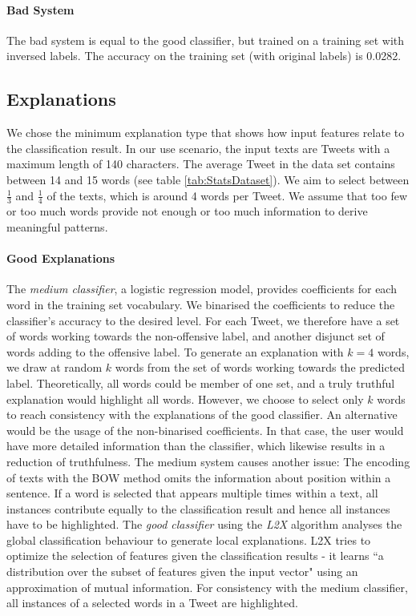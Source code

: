 \paragraph{Bad System}
The bad system is equal to the good classifier, but trained on a training set with inversed labels. The accuracy on the training set (with original labels) is 0.0282.



\subsection{Explanations} 
We chose the minimum explanation type that shows how input features relate to the classification result. In our use scenario, the input texts are Tweets with a maximum length of 140 characters. The average Tweet in the data set contains between 14 and 15 words (see table \ref{tab:StatsDataset}). We aim to select between $\frac{1}{3}$ and $\frac{1}{4}$ of the texts, which is around 4 words per Tweet. We assume that too few or too much words provide not enough or too much information to derive meaningful patterns. 

\paragraph{Good Explanations}
The \textit{medium classifier}, a logistic regression model, provides coefficients for each word in the training set vocabulary. We binarised the coefficients to reduce the classifier's accuracy to the desired level. For each Tweet, we therefore have a set of words working towards the non-offensive label, and another disjunct set of words adding to the offensive label. To generate an explanation with $k=4$ words, we draw at random $k$ words from the set of words working towards the predicted label. Theoretically, all words could be member of one set, and a truly truthful explanation would highlight all words. However, we choose to select only $k$ words to reach consistency with the explanations of the good classifier. An alternative would be the usage of the non-binarised coefficients. In that case, the user would have more detailed information than the classifier, which likewise results in a reduction of truthfulness. The medium system causes another issue: The encoding of texts with the BOW method omits the information about position within a sentence. If a word is selected that appears multiple times within a text, all instances contribute equally to the classification result and hence all instances have to be highlighted. The \textit{good classifier} using the \textit{L2X} algorithm analyses the global classification behaviour to generate local explanations. L2X tries to optimize the selection of features given the classification results - it learns ``a distribution over the subset of features given the input vector" \cite{chen2018learning} using an approximation of mutual information. For consistency with the medium classifier, all instances of a selected words in a Tweet are highlighted.

